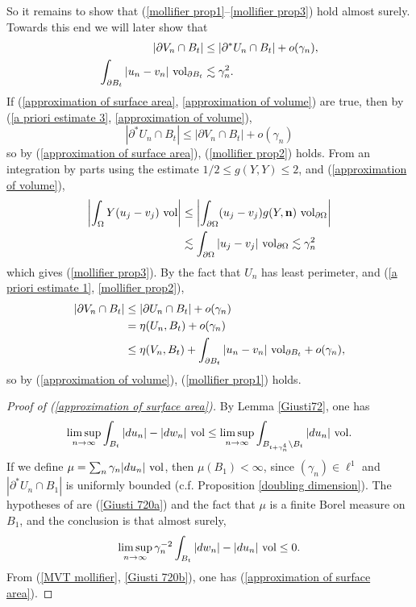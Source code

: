 So it remains to show that (\ref{mollifier prop1}--\ref{mollifier prop3}) hold almost surely.
Towards this end we will later show that
\begin{align}
|\partial V_n \cap B_t| &\leq |\partial^* U_n \cap B_t| + o(\gamma_n), \label{approximation of surface area} \\
\int_{\partial B_t} |u_n - v_n| ~\mathrm{vol}_{\partial B_t} &\lesssim \gamma_n^2. \label{approximation of volume}
\end{align}
If (\ref{approximation of surface area}, \ref{approximation of volume}) are true,
then by (\ref{a priori estimate 3}, \ref{approximation of volume}),
$$|\partial^* U_n \cap B_t| \leq |\partial V_n \cap B_t| + o(\gamma_n)$$
so by (\ref{approximation of surface area}), (\ref{mollifier prop2}) holds.
From an integration by parts using the estimate $1/2 \leq g(Y, Y) \leq 2$, and (\ref{approximation of volume}),
\begin{align*}
\left|\int_\Omega Y(u_j - v_j) ~\mathrm{vol}\right|
&\leq \left|\int_{\partial \Omega} (u_j - v_j)g(Y, \mathbf n) ~\mathrm{vol}_{\partial \Omega}\right| \\
&\lesssim \int_{\partial \Omega} |u_j - v_j| ~\mathrm{vol}_{\partial \Omega} \lesssim \gamma_n^2
\end{align*}
which gives (\ref{mollifier prop3}).
By the fact that $U_n$ has least perimeter, and (\ref{a priori estimate 1}, \ref{mollifier prop2}),
\begin{align*}
|\partial V_n \cap B_t| &\leq |\partial U_n \cap B_t| + o(\gamma_n) \\
&= \eta(U_n, B_t) + o(\gamma_n)\\
&\leq \eta(V_n, B_t) + \int_{\partial B_t} |u_n - v_n| ~\mathrm{vol}_{\partial B_t} + o(\gamma_n),
\end{align*}
so by (\ref{approximation of volume}), (\ref{mollifier prop1}) holds.


\begin{proof}[Proof of (\ref{approximation of surface area})]
By Lemma \ref{Giusti72}, one has
\begin{equation}\label{Giusti 720a}
\limsup_{n \to \infty} \int_{B_t} |du_n| - |dw_n| ~\mathrm{vol} \leq \limsup_{n \to \infty} \int_{B_{t + \gamma_n^4} \setminus B_t} |du_n| ~\mathrm{vol}.
\end{equation}
If we define $\mu = \sum_n \gamma_n|du_n| ~\mathrm{vol}$, then $\mu(B_1) < \infty$, since $(\gamma_n) \in \ell^1$ and $|\partial^* U_n \cap B_1|$ is uniformly bounded (c.f. Proposition \ref{doubling dimension}).
The hypotheses of \cite[(7.20)]{Giusti77} are (\ref{Giusti 720a}) and the fact that $\mu$ is a finite Borel measure on $B_1$, and the conclusion is that almost surely,
\begin{equation}\label{Giusti 720b}
\limsup_{n \to \infty} \gamma_n^{-2} \int_{B_t} |dw_n| - |du_n| ~\mathrm{vol} \leq 0.
\end{equation}
From (\ref{MVT mollifier}, \ref{Giusti 720b}), one has (\ref{approximation of surface area}).
\end{proof}

